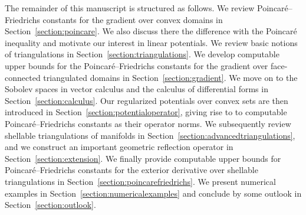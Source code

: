 \documentclass[10pt,a4paper]{article}
\begin{document}
The remainder of this manuscript is structured as follows.
We review Poincar\'e--Friedrichs constants for the gradient over convex domains in Section~\ref{section:poincare}. 
We also discuss there the difference with the Poincar\'e inequality and motivate our interest in linear potentials.
We review basic notions of triangulations in Section~\ref{section:triangulations}.
We develop computable upper bounds for the Poincar\'e--Friedrichs constants for the gradient over face-connected triangulated domains in Section~\ref{section:gradient}.
We move on to the Sobolev spaces in vector calculus and the calculus of differential forms in Section~\ref{section:calculus}. 
Our regularized potentials over convex sets are then introduced in Section~\ref{section:potentialoperator}, 
giving rise to to computable Poincar\'e--Friedrichs constants as their operator norms. 
We subsequently review shellable triangulations of manifolds in Section~\ref{section:advancedtriangulations},
and we construct an important geometric reflection operator in Section~\ref{section:extension}. 
We finally provide computable upper bounds for Poincar\'e--Friedrichs constants for the exterior derivative over shellable triangulations in Section~\ref{section:poincarefriedrichs}.
We present numerical examples in Section~\ref{section:numericalexamples} and conclude by some outlook in Section~\ref{section:outlook}. 
\end{document}

